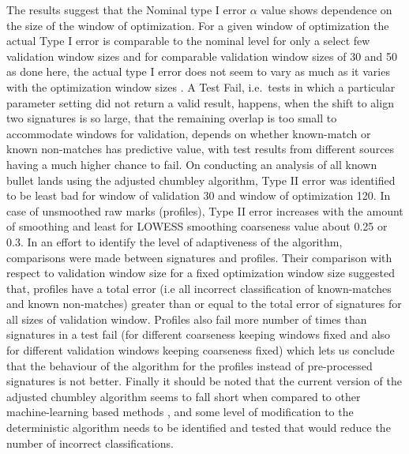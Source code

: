 \documentclass[12pt]{article}
\begin{document}
The results suggest that the Nominal type I error \(\alpha\) value shows
dependence on the size of the window of optimization. For a given window
of optimization the actual Type I error is comparable to the nominal
level for only a select few validation window sizes and for comparable
validation window sizes of 30 and 50 as done here, the actual type I
error does not seem to vary as much as it varies with the optimization
window sizes . A Test Fail, i.e.~tests in which a particular parameter
setting did not return a valid result, happens, when the shift to align
two signatures is so large, that the remaining overlap is too small to
accommodate windows for validation, depends on whether known-match or
known non-matches has predictive value, with test results from different
sources having a much higher chance to fail. On conducting an analysis
of all known bullet lands using the adjusted chumbley algorithm, Type II
error was identified to be least bad for window of validation 30 and
window of optimization 120. In case of unsmoothed raw marks (profiles),
Type II error increases with the amount of smoothing and least for
LOWESS smoothing coarseness value about 0.25 or 0.3. In an effort to
identify the level of adaptiveness of the algorithm, comparisons were
made between signatures and profiles. Their comparison with respect to
validation window size for a fixed optimization window size suggested
that, profiles have a total error (i.e all incorrect classification of
known-matches and known non-matches) greater than or equal to the total
error of signatures for all sizes of validation window. Profiles also
fail more number of times than signatures in a test fail (for different
coarseness keeping windows fixed and also for different validation
windows keeping coarseness fixed) which lets us conclude that the
behaviour of the algorithm for the profiles instead of pre-processed
signatures is not better. Finally it should be noted that the current
version of the adjusted chumbley algorithm seems to fall short when
compared to other machine-learning based methods \citet{aoas}, and some
level of modification to the deterministic algorithm needs to be
identified and tested that would reduce the number of incorrect
classifications.



\end{document}
